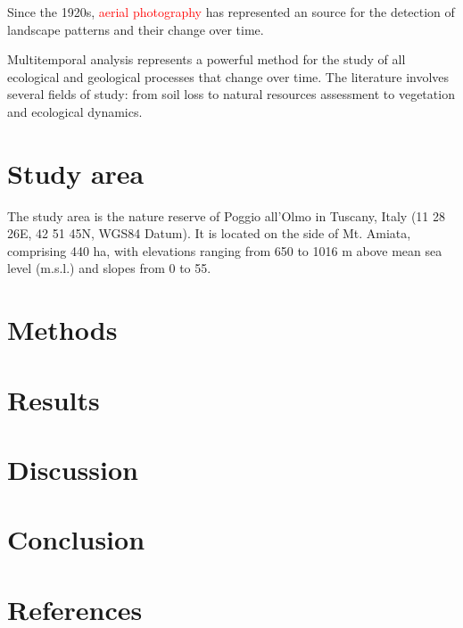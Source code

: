 Since the 1920s, \textcolor{red}{aerial photography} has represented an  source for the detection of landscape patterns and their change over time.

Multitemporal analysis represents a powerful method for the study of all ecological and geological processes that change over time. The literature involves several fields of study: from soil loss to natural resources assessment to vegetation and ecological dynamics.


\section{Study area}

The study area is the nature reserve of Poggio all’Olmo in Tuscany, Italy (11 28 26E, 42 51 45N, WGS84 Datum). It is located on the side of Mt. Amiata, comprising 440 ha, with elevations ranging from 650 to 1016 m above mean sea level (m.s.l.) and slopes from 0 to 55.

\section{Methods}

\section{Results}

\section{Discussion}

\section{Conclusion}

\section{References}






